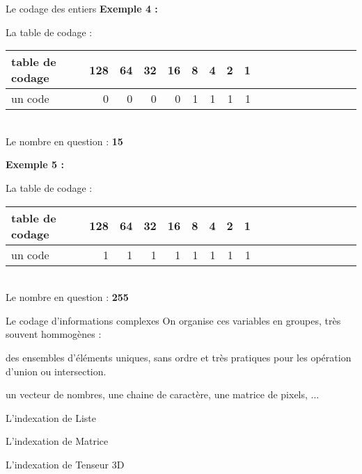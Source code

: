 \begin{frame}{Le codage des entiers}
    \textbf{Exemple 4 :}
    \begin{center}
        La table de codage : \\
        $\;$\\
        \begin{tabular}{|*{2}{l||r|r|r|r|r|r|r|r|}}
            \hline
                table de codage & 128 & 64 & 32 & 16 & 8 & 4 & 2 & 1 \\
            \hline
                un code         & 0   & 0  & 0  & 0  & 1 & 1 & 1 & 1 \\
            \hline
        \end{tabular} \\
        $\;$\\
        Le nombre en question : \textbf{15} \\
    \end{center}
    \textbf{Exemple 5 :}
    \begin{center}
        La table de codage : \\
        $\;$\\
        \begin{tabular}{|*{2}{l||r|r|r|r|r|r|r|r|}}
            \hline
                table de codage & 128 & 64 & 32 & 16 & 8 & 4 & 2 & 1 \\
            \hline
                un code         & 1   & 1  & 1  & 1  & 1 & 1 & 1 & 1 \\
            \hline
        \end{tabular} \\
        $\;$\\
        Le nombre en question : \textbf{255} \\
    \end{center}
\end{frame}

\begin{frame}{Le codage d'informations complexes}
    On organise ces variables en groupes, très souvent hommogènes :
    \begin{description}[<+->]
        \item [Les COLLECTIONS] des ensembles d'éléments uniques, sans ordre et très pratiques pour les opération d'union ou intersection.
        \item [Les LISTES] un vecteur de nombres, une chaine de caractère, une matrice de pixels, ...
        \item [ETC ...]
    \end{description}
\end{frame}

\begin{frame}{L'indexation de Liste}
\end{frame}

\begin{frame}{L'indexation de Matrice}
\end{frame}

\begin{frame}{L'indexation de Tenseur 3D}
\end{frame}
